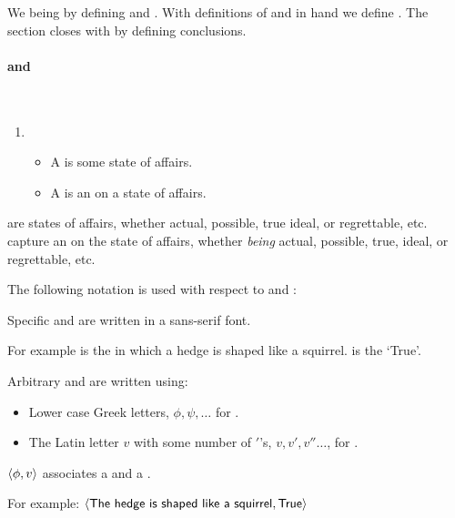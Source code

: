 \begin{note}
  We being by defining  and .
  With definitions of  and  in hand we define .
  The section closes with by defining conclusions.
\end{note}

\paragraph*{ and }

\begin{note}
  \begin{definition}
    \label{def:prop-val}
    \mbox{ }%
    \vspace{-\baselineskip}
    \begin{enumerate}[noitemsep, label=]
    \item
      \begin{itemize}
      \item
        A \emph{} is some state of affairs.
      \item
        A \emph{} is an \agpe{} on a state of affairs.
      \end{itemize}
    \end{enumerate}
    \vspace{-\baselineskip}
  \end{definition}

  \noindent%
   are states of affairs, whether actual, possible, true ideal, or regrettable, etc.
   capture an \agpe{} on the state of affairs, whether \emph{being} actual, possible, true, ideal, or regrettable, etc.
  
  The following notation is used with respect to  and :
  \begin{notationList}
  \item
    Specific  and  are written in a \textsf{sans-serif} font.
    
    For example  is the  in which a hedge is shaped like a squirrel.
     is the  `True'.
  \item
    Arbitrary  and  are written using:
    \begin{itemize}[noitemsep]
    \item
      Lower case Greek letters, \(\phi, \psi, \dots\) for .
    \item
      The Latin letter \(v\) with some number of \('\)'s, \(v, v', v'' \dots\), for .
    \end{itemize}
  \item
    \(\langle \phi, v \rangle\) associates a  and a .

    For example:
    \(\pv{\propI{The hedge is shaped like a squirrel}}{\valI{True}}\)
  \end{notationList}
\end{note}

